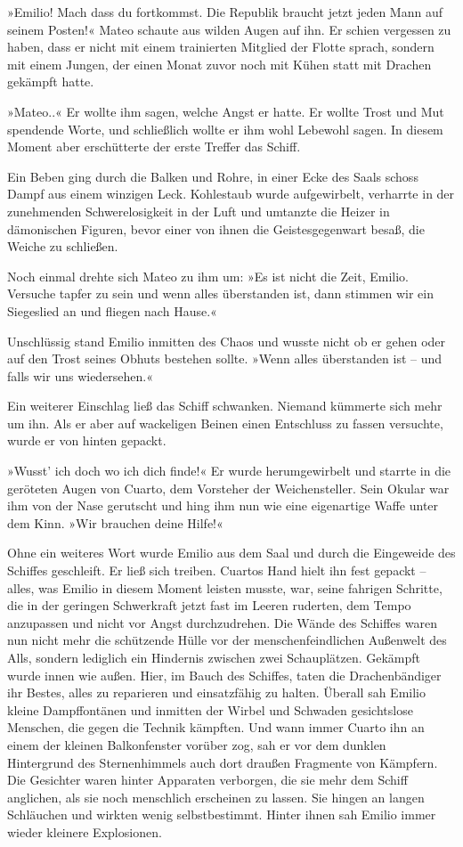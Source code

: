 »Emilio! Mach dass du fortkommst. Die Republik braucht jetzt jeden
Mann auf seinem Posten!« Mateo schaute aus wilden Augen auf ihn. Er
schien vergessen zu haben, dass er nicht mit einem trainierten
Mitglied der Flotte sprach, sondern mit einem Jungen, der einen
Monat zuvor noch mit Kühen statt mit Drachen gekämpft hatte.

»Mateo..« Er wollte ihm sagen, welche Angst er hatte. Er wollte
Trost und Mut spendende Worte, und schließlich wollte er ihm wohl
Lebewohl sagen. In diesem Moment aber erschütterte der erste
Treffer das Schiff.

\bigpar

Ein Beben ging durch die Balken und Rohre, in einer Ecke des Saals
schoss Dampf aus einem winzigen Leck. Kohlestaub wurde
aufgewirbelt, verharrte in der zunehmenden Schwerelosigkeit in der
Luft und umtanzte die Heizer in dämonischen Figuren, bevor einer
von ihnen die Geistesgegenwart besaß, die Weiche zu schließen.

Noch einmal drehte sich Mateo zu ihm um: »Es ist nicht die Zeit,
Emilio. Versuche tapfer zu sein und wenn alles überstanden ist,
dann stimmen wir ein Siegeslied an und fliegen nach Hause.«

Unschlüssig stand Emilio inmitten des Chaos und wusste nicht ob er
gehen oder auf den Trost seines Obhuts bestehen sollte. »Wenn alles
überstanden ist – und falls wir uns wiedersehen.«

Ein weiterer Einschlag ließ das Schiff schwanken. Niemand kümmerte
sich mehr um ihn. Als er aber auf wackeligen Beinen einen
Entschluss zu fassen versuchte, wurde er von hinten gepackt.

»Wusst' ich doch wo ich dich finde!« Er wurde herumgewirbelt und
starrte in die geröteten Augen von Cuarto, dem Vorsteher der
Weichensteller. Sein Okular war ihm von der Nase gerutscht und hing
ihm nun wie eine eigenartige Waffe unter dem Kinn. »Wir brauchen
deine Hilfe!«

Ohne ein weiteres Wort wurde Emilio aus dem Saal und durch die
Eingeweide des Schiffes geschleift. Er ließ sich treiben. Cuartos
Hand hielt ihn fest gepackt – alles, was Emilio in diesem Moment
leisten musste, war, seine fahrigen Schritte, die in der geringen
Schwerkraft jetzt fast im Leeren ruderten, dem Tempo anzupassen und
nicht vor Angst durchzudrehen. Die Wände des Schiffes waren nun
nicht mehr die schützende Hülle vor der menschenfeindlichen
Außenwelt des Alls, sondern lediglich ein Hindernis zwischen zwei
Schauplätzen. Gekämpft wurde innen wie außen. Hier, im Bauch des
Schiffes, taten die Drachenbändiger ihr Bestes, alles zu reparieren
und einsatzfähig zu halten. Überall sah Emilio kleine Dampffontänen
und inmitten der Wirbel und Schwaden gesichtslose Menschen, die
gegen die Technik kämpften. Und wann immer Cuarto ihn an einem der
kleinen Balkonfenster vorüber zog, sah er vor dem dunklen
Hintergrund des Sternenhimmels auch dort draußen Fragmente von
Kämpfern. Die Gesichter waren hinter Apparaten verborgen, die sie
mehr dem Schiff anglichen, als sie noch menschlich erscheinen zu
lassen. Sie hingen an langen Schläuchen und wirkten wenig
selbstbestimmt. Hinter ihnen sah Emilio immer wieder kleinere
Explosionen.


